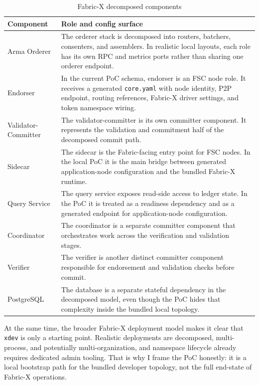 \begin{table}[h]
\centering
\begin{tabularx}{\textwidth}{|l|X|}
\hline
\textbf{Component} & \textbf{Role and config surface} \\
\hline
Arma Orderer & The orderer stack is decomposed into routers, batchers, consenters, and assemblers. In realistic local layouts, each role has its own RPC and metrics ports rather than sharing one orderer endpoint. \\
\hline
Endorser & In the current PoC schema, endorser is an FSC node role. It receives a generated \texttt{core.yaml} with node identity, P2P endpoint, routing references, Fabric-X driver settings, and token namespace wiring. \\
\hline
Validator-Committer & The validator-committer is its own committer component. It represents the validation and commitment half of the decomposed commit path. \\
\hline
Sidecar & The sidecar is the Fabric-facing entry point for FSC nodes. In the local PoC it is the main bridge between generated application-node configuration and the bundled Fabric-X runtime. \\
\hline
Query Service & The query service exposes read-side access to ledger state. In the PoC it is treated as a readiness dependency and as a generated endpoint for application-node configuration. \\
\hline
Coordinator & The coordinator is a separate committer component that orchestrates work across the verification and validation stages. \\
\hline
Verifier & The verifier is another distinct committer component responsible for endorsement and validation checks before commit. \\
\hline
PostgreSQL & The database is a separate stateful dependency in the decomposed model, even though the PoC hides that complexity inside the bundled local topology. \\
\hline
\end{tabularx}
\caption{Fabric-X decomposed components}
\label{tab:fabricx-components}
\end{table}

At the same time, the broader Fabric-X deployment model makes it clear that \texttt{xdev} is only a starting point. Realistic deployments are decomposed, multi-process, and potentially multi-organization, and namespace lifecycle already requires dedicated admin tooling. That is why I frame the PoC honestly: it is a local bootstrap path for the bundled developer topology, not the full end-state of Fabric-X operations.

